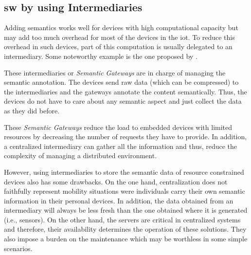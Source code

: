 
\subsection{\acs{sw} by using Intermediaries}
\label{sec:sw_intermediaries}




Adding semantics works well for devices with high computational capacity but may add too much overhead for most of the devices in the \ac{iot}.
To reduce this overhead in such devices, part of this computation is usually delegated to an intermediary.
Some noteworthy example is the one proposed by \citet{broring_semantic_2009}.




These intermediaries or \emph{Semantic Gateways} are in charge of managing the semantic annotation.
The devices send raw data (which can be compressed) to the intermediaries and the gateways annotate the content semantically.
Thus, the devices do not have to care about any semantic aspect and just collect the data as they did before.

These \emph{Semantic Gateways} reduce the load to embedded devices with limited resources by decreasing the number of requests they have to provide.
In addition, a centralized intermediary can gather all the information and thus, reduce the complexity of managing a distributed environment.

However, using intermediaries to store the semantic data of resource constrained devices also has some drawbacks.
On the one hand, centralization does not faithfully represent mobility situations were individuals carry their own semantic information in their personal devices.
In addition, the data obtained from an intermediary will always be less fresh than the one obtained where it is generated (i.e., sensors).
On the other hand, the servers are critical in centralized systems and therefore, their availability determines the operation of these solutions.
They also impose a burden on the maintenance which may be worthless in some simple scenarios.


